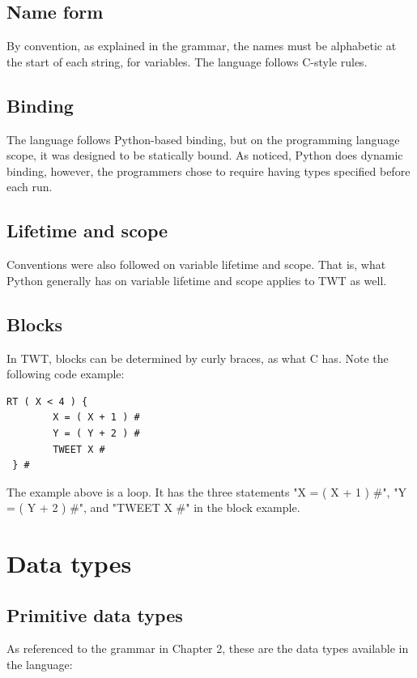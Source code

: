 \documentclass[11pt,a4paper]{report}
\begin{document}
\section{Name form}

By convention, as explained in the grammar, the names must be alphabetic at the
start of each string, for variables. The language follows C-style rules.

\section{Binding}

The language follows Python-based binding, but on the programming language
scope, it was designed to be statically bound. As noticed, Python does dynamic
binding, however, the programmers chose to require having types specified before
each run.

\section{Lifetime and scope}

Conventions were also followed on variable lifetime and scope. That is, what
Python generally has on variable lifetime and scope applies to TWT as well.

\section{Blocks}

In TWT, blocks can be determined by curly braces, as what C has. Note the
following code example:

\begin{lstlisting}
RT ( X < 4 ) { 
		X = ( X + 1 ) #
		Y = ( Y + 2 ) #
		TWEET X #
 } #
\end{lstlisting}

The example above is a loop. It has the three statements "X = ( X + 1 ) \#", "Y
= ( Y + 2 ) \#", and "TWEET X \#" in the block example.

\chapter{Data types}

\section{Primitive data types}

As referenced to the grammar in Chapter 2, these are the data types available in
the language:
\end{document}
